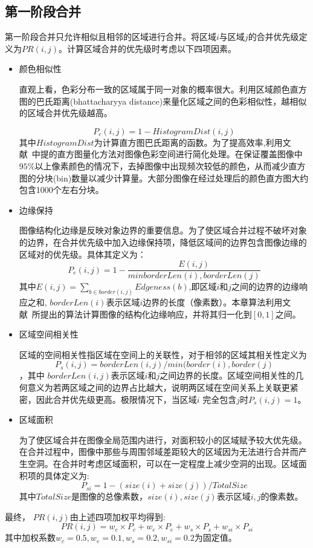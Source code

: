 \subsection{第一阶段合并}
\label{subsec:mergeP1}
第一阶段合并只允许相似且相邻的区域进行合并。将区域$i$与区域$j$的合并优先级定义为$PR(i,j)$。计算区域合并的优先级时考虑以下四项因素。
\begin{itemize}
\item 颜色相似性\par
    直观上看，色彩分布一致的区域属于同一对象的概率很大。利用区域颜色直方图的巴氏距离(bhattacharyya distance)来量化区域之间的色彩相似性，越相似的区域合并优先级越高。

    \begin{equation}
    \label{equ:chap2:Pc}
    P_{c}(i,j)=1-HistogramDist(i,j)
    \end{equation}
    其中$HistogramDist$为计算直方图巴氏距离的函数。为了提高效率,利用文献~中提的直方图量化方法对图像色彩空间进行简化处理。在保证覆盖图像中$95\%$以上像素颜色的情况下，去掉图像中出现频次较低的颜色，从而减少直方图的分块(bin)数量以减少计算量。大部分图像在经过处理后的颜色直方图大约包含1000个左右分块。
\item 边缘保持\par
    图像结构化边缘是反映对象边界的重要信息。为了使区域合并过程不破坏对象的边界，在合并优先级中加入边缘保持项，降低区域间的边界包含图像边缘的区域对的优先级。具体其定义为：
    $$P_{e}(i,j)=1-\frac{E(i,j)}{minborderLen(i),borderLen(j)}$$
    其中$E(i,j)=\sum_{b\in border(i,j)}Edgeness(b)$,即区域$i$和$j$之间的边界的边缘响应之和, $borderLen(i)$表示区域$i$边界的长度（像素数）。本章算法利用文献~所提出的算法计算图像的结构化边缘响应，并将其归一化到$[0,1]$之间。
\item 区域空间相关性\par
    区域的空间相关性指区域在空间上的关联性，对于相邻的区域其相关性定义为$$P_{s}(i,j)=borderLen(i,j)/min⁡(border(i),border(j)$$，其中 $borderLen(i,j)$表示区域$i$和$j$之间边界的长度。区域空间相关性的几何意义为若两区域之间的边界占比越大，说明两区域在空间关系上关联更紧密，因此合并优先级更高。极限情况下，当区域$i$ 完全包含$j$时$P_{s} (i,j)=1$。
\item 区域面积\par
    为了使区域合并在图像全局范围内进行，对面积较小的区域赋予较大优先级。在合并过程中，图像中那些与周围邻域差距较大的区域因为无法进行合并而产生空洞。在合并时考虑区域面积，可以在一定程度上减少空洞的出现。区域面积项的具体定义为:
    $$P_{si}=1-(size(i)+size(j))/TotalSize$$
其中$TotalSize$是图像的总像素数，$size(i),size(j)$表示区域$i,j$的像素数。
\end{itemize}
最终， $PR(i,j)$由上述四项加权平均得到:
\begin{equation}
   \label{equ:chap2:PR}
   PR(i,j)=w_{c}\times P_{c}+w_{e} \times P_{e} + w_{s} \times P_{s} + w_{si} \times P_{si}
\end{equation}
其中加权系数$w_c=0.5, w_e=0.1, w_s=0.2, w_{si}=0.2$为固定值。\par

